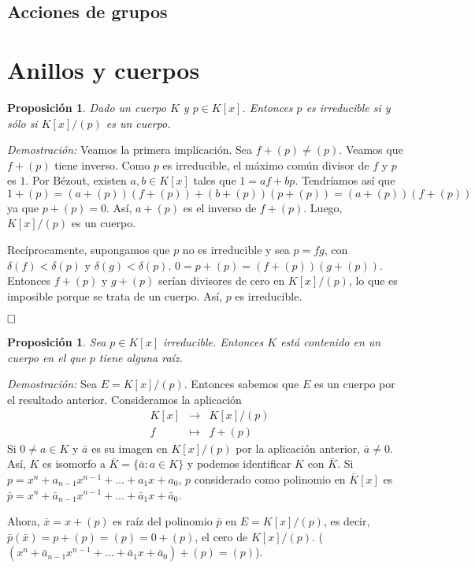 \documentclass[12pt]{article}
\newtheorem{proposition}[theorem]{Proposición}
\begin{document}
\subsection{Acciones de grupos}

\section{Anillos y cuerpos}

\begin{proposition} Dado un cuerpo $K$ y $p \in K[x]$. Entonces $p$ es irreducible si y sólo si $K[x]/(p)$ es un cuerpo.
\end{proposition}
\emph{Demostración: }Veamos la primera implicación. Sea $f + (p) \neq (p)$. Veamos que $f + (p)$ tiene inverso. Como $p$ es irreducible, el máximo común divisor de $f$ y $p$ es $1$. Por Bézout, existen $a,b \in K[x]$ tales que $1 = af + bp$. Tendríamos así que $$1 + (p) = (a+ (p))(f+(p)) + (b+(p))(p+(p)) = (a+ (p))(f+(p))$$ ya que $p+(p)=0$. Así, $a+(p)$ es el inverso de $f+(p)$. Luego, $K[x]/(p)$ es un cuerpo.

Recíprocamente, supongamos que $p$ no es irreducible y sea $p = fg$, con $\delta(f) < \delta (p)$ y $\delta(g) < \delta (p)$. $0 =p +(p) = (f+(p))(g+(p))$. Entonces $f + (p)$ y $g +(p)$ serían divisores de cero en $K[x]/(p)$, lo que es imposible porque se trata de un cuerpo. Así, $p$ es irreducible.

$\hfill \square$

\begin{proposition}\label{eq:ac1} Sea $p \in K[x]$ irreducible. Entonces $K$ está contenido en un cuerpo en el que $p$ tiene alguna raíz.
\end{proposition}
\emph{Demostración: } Sea $E = K[x]/(p)$. Entonces sabemos que $E$ es un cuerpo por el resultado anterior. Consideramos la aplicación $$\begin{array}{rccl}
&K[x]&\longrightarrow &K[x]/(p) \\
&f& \longmapsto &f+(p)
\end{array}
$$
Si $0 \neq a \in K$ y $\bar{a}$ es su imagen en $K[x]/(p)$ por la aplicación anterior, $\bar{a} \neq 0$. Así, $K$ es isomorfo a $\bar{K} = \lbrace \bar{a}: a \in K \rbrace$ y podemos identificar $K$ con $\bar{K}$. Si $p = x^{n} + a_{n-1}x^{n-1} + \ldots + a_{1}x + a_{0}$, $p$ considerado como polinomio en $\bar{K}[x]$ es $\bar{p} = x^{n}+ \bar{a}_{n-1}x^{n-1}+ \ldots + \bar{a}_{1}x + \bar{a}_{0}$.

Ahora, $\bar{x} = x +(p)$ es raíz del polinomio $\bar{p}$ en $E= K[x]/(p)$, es decir, $\bar{p}(\bar{x}) = p+(p) = (p) = 0 +(p)$, el cero de $K[x]/(p)$. ($(x^{n}+ \bar{a}_{n-1}x^{n-1}+ \ldots + \bar{a}_{1}x + \bar{a}_{0}) + (p) = (p)$).
\end{document}
